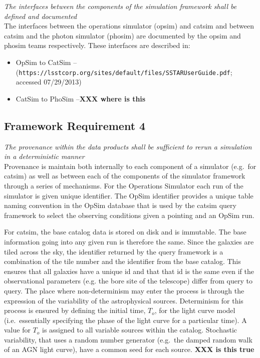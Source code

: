 \documentclass[]{article}
\begin{document}
{\it  The interfaces between the components of the simulation framework shall be defined 
and documented}\\

The interfaces between the operations simulator (opsim) and catsim and
between catsim and the photon simulator (phosim) are documented by the
opsim and phosim teams respectively.  These interfaces are described in:
\begin{itemize}
\item OpSim to CatSim -- ({\tt https://lsstcorp.org/sites/default/files/SSTARUserGuide.pdf}; accessed 07/29/2013)
\item CatSim to PhoSim --{\bf XXX where is this}
\end{itemize}

\subsection{Framework Requirement 4} 

{\it The provenance within the data products shall be sufficient to rerun a simulation in a 
deterministic manner}\\

Provenance is maintain both internally to each component of a
simulator (e.g.\ for catsim) as well as between each of the components
of the simulator framework through a series of mechanisms. For the
Operations Simulator each run of the simulator is given unique
identifier.  The OpSim identifier provides a unique table naming
convention in the OpSim database that is used by the catsim query
framework to select the observing conditions given a pointing and an
OpSim run. 

For catsim, the base catalog data is stored on disk and is
immutable. The base information going into any given run is therefore
the same.  Since the galaxies are tiled across the sky, the identifier
returned by the query framework is a combination of the tile number
and the identifier from the base catalog. This ensures that all
galaxies have a unique id and that that id is the same even if the
observational parameters (e.g. the bore site of the telescope) differ
from query to query.  The place where non-determinism may enter the
process is through the expression of the variability of the
astrophysical sources. Determinism for this process is ensured by
defining the initial time, $T_o$, for the light curve model (i.e.\
essentially specifying the phase of the light curve for a particular
time). A value for $T_o$ is assigned to all variable sources within
the catalog.  Stochastic variability, that uses a random number
generator (e.g.\ the damped random walk of an AGN light curve), have a
common seed for each source.
{\bf XXX is this true}
\end{document}
